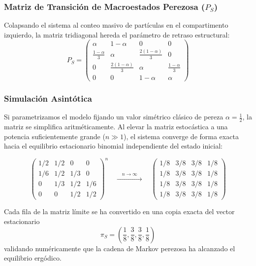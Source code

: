 \subsubsection{Matriz de Transición de Macroestados Perezosa ($P_S$)}
\noindent
Colapsando el sistema al conteo masivo de partículas en el compartimento izquierdo, la matriz tridiagonal hereda el parámetro de retraso estructural:
\[
P_S = 
\begin{pmatrix}
    \alpha & 1-\alpha & 0 & 0 \\[0.15cm]
    \frac{1-\alpha}{3} & \alpha & \frac{2(1-\alpha)}{3} & 0 \\[0.15cm]
    0 & \frac{2(1-\alpha)}{3} & \alpha & \frac{1-\alpha}{3} \\[0.15cm]
    0 & 0 & 1-\alpha & \alpha
\end{pmatrix}
\]

\subsubsection{Simulación Asintótica }
\noindent
Si parametrizamos el modelo fijando un valor simétrico clásico de pereza $\alpha = \frac{1}{2}$, la matriz se simplifica aritméticamente. Al elevar la matriz estocástica a una potencia suficientemente grande ($n \gg 1$), el sistema converge de forma exacta hacia el equilibrio estacionario binomial independiente del estado inicial:

\[
\begin{pmatrix} 
    1/2 & 1/2 & 0 & 0 \\[0.1cm] 
    1/6 & 1/2 & 1/3 & 0 \\[0.1cm] 
    0 & 1/3 & 1/2 & 1/6 \\[0.1cm] 
    0 & 0 & 1/2 & 1/2 
\end{pmatrix}^n
\quad \xrightarrow{\quad n \to \infty \quad} \quad
\begin{pmatrix} 
    1/8 & 3/8 & 3/8 & 1/8 \\[0.1cm] 
    1/8 & 3/8 & 3/8 & 1/8 \\[0.1cm] 
    1/8 & 3/8 & 3/8 & 1/8 \\[0.1cm] 
    1/8 & 3/8 & 3/8 & 1/8 
\end{pmatrix}
\]

\noindent 
Cada fila de la matriz límite se ha convertido en una copia exacta del vector estacionario 
$$\pi_S = \left(\frac{1}{8}, \frac{3}{8}, \frac{3}{8}, \frac{1}{8}\right)$$
validando numéricamente que la cadena de Markov perezosa ha alcanzado el equilibrio ergódico.


